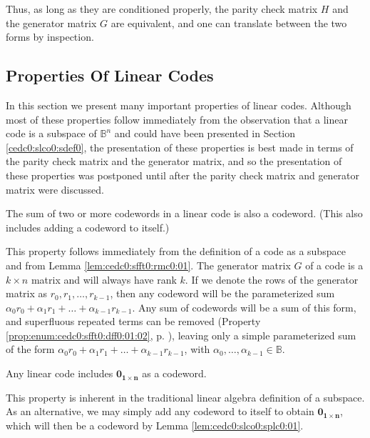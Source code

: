 Thus, as long as they are conditioned properly, the parity check matrix $H$ and the
generator matrix $G$ are equivalent, and one can translate between the two forms
by inspection.


\subsection{Properties Of Linear Codes}
\label{cedc0:slco0:splc0}

In this section we present many important properties of linear codes.
Although most of these properties follow immediately from the observation
that a linear code is a subspace of $\mathbb{B}^n$ and could have been 
presented in Section \ref{cedc0:slco0:sdef0}, the presentation of these properties
is best made in terms of the parity check matrix and the generator matrix,
and so the presentation of these properties was postponed until after the
parity check matrix and generator matrix were discussed.

\begin{vworklemmastatement}
\label{lem:cedc0:slco0:splc0:01}
The sum of two or more codewords in a linear code is also a codeword.  (This also includes
adding a codeword to itself.)
\end{vworklemmastatement}
\begin{vworklemmaproof}
This property follows immediately from the definition of a code as a subspace and 
from Lemma \ref{lem:cedc0:sfft0:rmc0:01}.  The generator matrix $G$ of a code 
is a $k \times n$ matrix and will always have rank $k$.  If we denote the rows of
the generator matrix as $r_0, r_1, \ldots, r_{k-1}$, then any codeword will be the
parameterized sum $\alpha_0 r_0 + \alpha_1 r_1 + \ldots + \alpha_{k-1} r_{k-1}$.
Any sum of codewords will be a sum of this form, and 
superfluous repeated terms can be removed
(Property \ref{prop:enum:cedc0:sfft0:dff0:01:02}, p. \pageref{prop:enum:cedc0:sfft0:dff0:01:02}),
leaving only a simple parameterized sum of the form
$\alpha_0 r_0 + \alpha_1 r_1 + \ldots + \alpha_{k-1} r_{k-1}$,
with $\alpha_0, \ldots, \alpha_{k-1} \in \mathbb{B}$.
\end{vworklemmaproof}

\begin{vworklemmastatement}
\label{lem:cedc0:slco0:splc0:02}
Any linear code includes $\mathbf{0_{1 \times n}}$ as a codeword.
\end{vworklemmastatement}
\begin{vworklemmaproof}
This property is inherent in the traditional linear algebra definition
of a subspace.  As an alternative, we may simply add any codeword to itself
to obtain $\mathbf{0_{1 \times n}}$, which will then be a codeword
by Lemma \ref{lem:cedc0:slco0:splc0:01}.
\end{vworklemmaproof}

